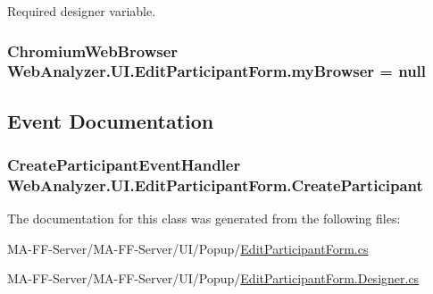Required designer variable. 

\hypertarget{class_web_analyzer_1_1_u_i_1_1_edit_participant_form_a6d84e654a3d464fcd61e2b6c4f96956e}{}
\subsubsection[{my\+Browser}]{\setlength{\rightskip}{0pt plus 5cm}Chromium\+Web\+Browser Web\+Analyzer.\+U\+I.\+Edit\+Participant\+Form.\+my\+Browser = null\hspace{0.3cm}{\ttfamily [private]}}\label{class_web_analyzer_1_1_u_i_1_1_edit_participant_form_a6d84e654a3d464fcd61e2b6c4f96956e}


\subsection{Event Documentation}
\hypertarget{class_web_analyzer_1_1_u_i_1_1_edit_participant_form_a3c5b726a8fd6993ccc519319a6850ce3}{}
\subsubsection[{Create\+Participant}]{\setlength{\rightskip}{0pt plus 5cm}Create\+Participant\+Event\+Handler Web\+Analyzer.\+U\+I.\+Edit\+Participant\+Form.\+Create\+Participant}\label{class_web_analyzer_1_1_u_i_1_1_edit_participant_form_a3c5b726a8fd6993ccc519319a6850ce3}


The documentation for this class was generated from the following files\+:\begin{DoxyCompactItemize}
\item 
M\+A-\/\+F\+F-\/\+Server/\+M\+A-\/\+F\+F-\/\+Server/\+U\+I/\+Popup/\hyperlink{_edit_participant_form_8cs}{Edit\+Participant\+Form.\+cs}\item 
M\+A-\/\+F\+F-\/\+Server/\+M\+A-\/\+F\+F-\/\+Server/\+U\+I/\+Popup/\hyperlink{_edit_participant_form_8_designer_8cs}{Edit\+Participant\+Form.\+Designer.\+cs}\end{DoxyCompactItemize}
